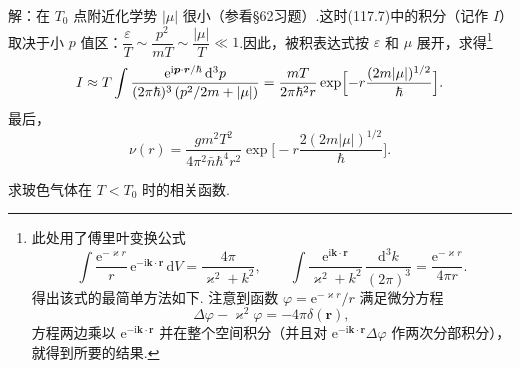 \begin{xiti}
解：在 $T_{0}$ 点附近化学势 $|\mu|$ 很小（参看§62习题）.这时(117.7)中的积分（记作
$I$）取决于小 $p$ 值区：$\dfrac{\varepsilon}{T}\sim\dfrac{p^{2}}{mT}
\sim\dfrac{|\mu|}{T}\ll1$.因此，被积表达式按 $\varepsilon$ 和 $\mu$ 展开，求得\footnote{此处用了傅里叶变换公式
\begin{equation*}
  \int\frac{\mathrm{e}^{-\varkappa r}}{r}\,
  \mathrm{e}^{-\mathrm{i}\boldsymbol{k}\cdot\boldsymbol{r}}\,\mathrm{d}V
  =\frac{4\pi}{\varkappa^{2}+k^{2}},\qquad
  \int\frac{\mathrm{e}^{\mathrm{i}\boldsymbol{k}\cdot\boldsymbol{r}}}
  {\varkappa^{2}+k^{2}}\,\frac{\mathrm{d}^{3}k}{(2\pi)^{3}}
  =\frac{\mathrm{e}^{-\varkappa r}}{4\pi r}.
\end{equation*}
得出该式的最简单方法如下. 注意到函数 $\varphi=\mathrm{e}^{-\varkappa r}/r$ 满足微分方程
\begin{equation*}
  \Delta\varphi-\varkappa^{2}\varphi=-4\pi\delta(\boldsymbol{r}),
\end{equation*}
方程两边乘以 $\mathrm{e}^{-\mathrm{i}\boldsymbol{k}\cdot\boldsymbol{r}}$ 并在整个空间积分（并且对 $\mathrm{e}^{-\mathrm{i}\boldsymbol{k}\cdot\boldsymbol{r}}\Delta\varphi$ 作两次分部积分），就得到所要的结果.}
\begin{equation*}
  I\approx T\int
  \frac{\mathrm{e}^{\mathrm{i}\boldsymbol{p}\cdot\boldsymbol{r}/\hbar}\,
  \mathrm{d}^{3}p}{(2\pi\hbar)^{3}\left(p^{2}/2m+|\mu|\right)}
  =\frac{mT}{2\pi\hbar^{2}r}
  \exp\Bigl[-r\frac{(2m|\mu|)^{1/2}}{\hbar}\Bigr].
\end{equation*}
最后，
\begin{equation*}
  \nu(r)=\frac{gm^{2}T^{2}}{4\pi^{2}\bar{n}\hbar^{4}r^{2}}
  \exp\biggl[-r\frac{2(2m|\mu|)^{1/2}}{\hbar}\biggr].
\end{equation*}

\quad 求玻色气体在 $T<T_{0}$ 时的相关函数.


\end{xiti}
